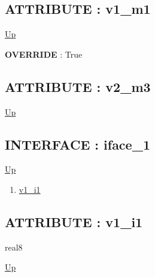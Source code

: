 \subsection*{ATTRIBUTE : v1\_m1}
\hypertarget{ecldoc:example_2.mod_3.v1_m1}{}
\par
\begin{minipage}[t]{\textwidth}
\begin{flushleft}
  
\end{flushleft}
\end{minipage}
\hyperlink{ecldoc:example_2.mod_3}{Up} \\
\par
\par
\textbf{OVERRIDE} : True \\
\subsection*{ATTRIBUTE : v2\_m3}
\hypertarget{ecldoc:example_2.mod_3.v2_m3}{}
\par
\begin{minipage}[t]{\textwidth}
\begin{flushleft}
  
\end{flushleft}
\end{minipage}
\hyperlink{ecldoc:example_2.mod_3}{Up} \\
\par
\par

\subsection*{INTERFACE : iface\_1}
\hypertarget{ecldoc:example_2.iface_1}{}
\par
\begin{minipage}[t]{\textwidth}
\begin{flushleft}
  
\end{flushleft}
\end{minipage}
\hyperlink{ecldoc:example_2}{Up} \\
\par
\par
\begin{enumerate}
\item \hyperlink{ecldoc:example_2.iface_1.v1_i1}{v1\_i1}
\end{enumerate}
\subsection*{ATTRIBUTE : v1\_i1}
\hypertarget{ecldoc:example_2.iface_1.v1_i1}{}
\par
\begin{minipage}[t]{\textwidth}
\begin{flushleft}
real8  
\end{flushleft}
\end{minipage}
\hyperlink{ecldoc:example_2.iface_1}{Up} \\
\par
\par

